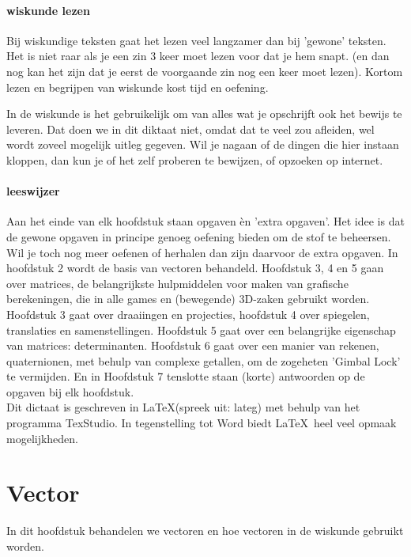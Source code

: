 \subsubsection{wiskunde lezen}
Bij wiskundige teksten gaat het lezen veel langzamer  dan bij 'gewone' teksten. Het is niet raar als je een zin 3 keer moet lezen voor dat je hem snapt. (en dan nog kan het zijn dat je eerst de voorgaande zin nog een keer moet lezen). Kortom lezen en begrijpen van wiskunde kost tijd en oefening.

In de wiskunde is het gebruikelijk om van alles wat je opschrijft ook het bewijs te leveren. Dat doen we in dit diktaat niet, omdat dat te veel zou afleiden, wel wordt zoveel mogelijk uitleg gegeven. Wil je nagaan of de dingen die hier instaan kloppen, dan kun je of het zelf proberen te bewijzen, of opzoeken op internet.

\subsubsection {leeswijzer}
Aan het einde van elk hoofdstuk staan opgaven èn 'extra opgaven'. Het idee is dat de gewone opgaven in principe genoeg oefening bieden om de stof te beheersen. Wil je toch nog meer oefenen of herhalen dan zijn daarvoor de extra opgaven. In hoofdstuk 2 wordt de basis van vectoren behandeld. Hoofdstuk 3, 4 en 5 gaan over matrices, de belangrijkste hulpmiddelen voor maken van grafische berekeningen, die in alle games en (bewegende) 3D-zaken gebruikt worden. Hoofdstuk 3 gaat over draaiingen en projecties, hoofdstuk 4 over spiegelen, translaties en samenstellingen. Hoofdstuk 5 gaat over een belangrijke eigenschap van matrices: determinanten. Hoofdstuk 6 gaat over een manier van rekenen, quaternionen, met behulp van complexe getallen, om de zogeheten 'Gimbal Lock' te vermijden. En in Hoofdstuk 7 tenslotte staan (korte) antwoorden op de opgaven bij elk hoofdstuk. \\
Dit dictaat is geschreven in \LaTeX   \quad(spreek uit: lateg) met behulp van het programma TexStudio. In tegenstelling tot Word biedt  \LaTeX \   heel veel opmaak mogelijkheden.



\chapter{Vector}
\label{chap:vectoren}
In dit hoofdstuk behandelen we vectoren en hoe vectoren in de wiskunde gebruikt worden.\\ \\

